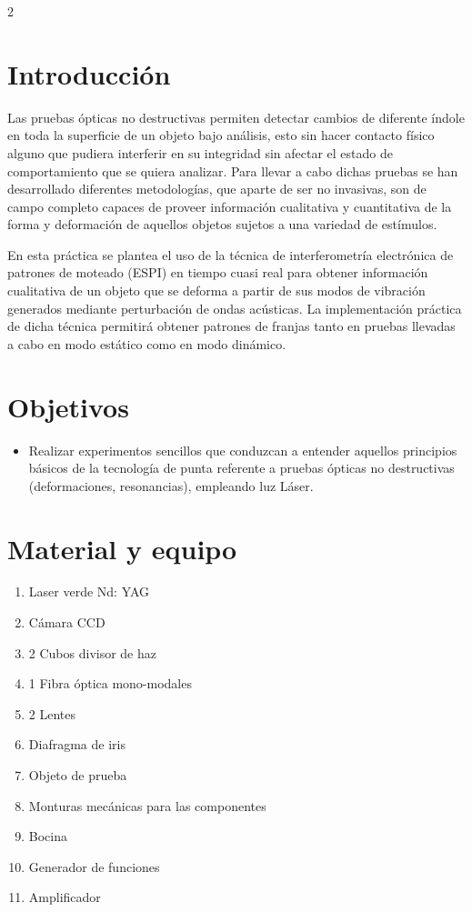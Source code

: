 \documentclass[letterpaper]{article}
\begin{document}
	\begin{multicols}{2}
		
		\section*{Introducción}
		
		Las pruebas ópticas no destructivas permiten detectar cambios de diferente índole en toda la superficie de un objeto bajo análisis, esto sin hacer contacto físico alguno que pudiera interferir en su integridad sin afectar el estado de comportamiento que se quiera analizar. Para llevar a cabo dichas pruebas se han desarrollado diferentes metodologías, que aparte de ser no invasivas, son de campo completo capaces de proveer información cualitativa y cuantitativa de la forma y deformación de aquellos objetos sujetos a una variedad de estímulos.
		
		En esta práctica se plantea el uso de la técnica de interferometría electrónica de patrones de moteado (ESPI) en tiempo cuasi real para obtener información cualitativa de un objeto que se deforma a partir de sus modos de vibración generados mediante perturbación de ondas acústicas. La implementación práctica de dicha técnica permitirá obtener patrones de franjas tanto en pruebas llevadas a cabo en modo estático como en modo dinámico. 
		
		\section*{Objetivos}
		
		\begin{itemize}
			\item Realizar experimentos sencillos que conduzcan a entender aquellos principios básicos de la tecnología de punta referente a pruebas ópticas no destructivas (deformaciones, resonancias), empleando luz Láser.
		\end{itemize}
		
		\section*{Material y equipo}
		
		\begin{enumerate}
			\item Laser verde Nd: YAG
			\item Cámara CCD
			\item 2 Cubos divisor de haz
			\item 1 Fibra óptica mono-modales
			\item 2 Lentes
			\item Diafragma de iris
			\item Objeto de prueba
			\item Monturas mecánicas para las componentes
			\item Bocina
			\item Generador de funciones
			\item Amplificador
		\end{enumerate}
		

\end{multicols}
\end{document}
